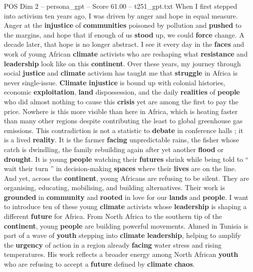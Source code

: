 \begin{textsample}{POS Dim 2 – persona\_gpt – Score 61.00 – t251\_gpt.txt}  \label{ex:f2_pos_010}
When I first stepped into activism ten years ago, I was driven by anger and hope in equal measure.
Anger at the \textbf{injustice} of \textbf{communities} poisoned by pollution and \textbf{pushed} to the margins, and hope that if enough of us \textbf{stood} up, we could \textbf{force} change.
A decade later, that hope is no longer abstract.
I see it every day in the \textbf{faces} and work of young African \textbf{climate} activists who are reshaping what \textbf{resistance} and \textbf{leadership} look like on this \textbf{continent}.
Over these years, my journey through social \textbf{justice} and \textbf{climate} activism has taught me that \textbf{struggle} in Africa is never single-issue. \textbf{Climate} \textbf{injustice} is bound up with colonial histories, economic \textbf{exploitation}, \textbf{land} dispossession, and the daily \textbf{realities} of \textbf{people} who did almost nothing to cause this \textbf{crisis} yet are among the first to pay the price.
Nowhere is this more visible than here in Africa, which is heating faster than many other regions despite contributing the least to global greenhouse gas emissions.
This contradiction is not a statistic to \textbf{debate} in conference halls ; it is a lived \textbf{reality}.
It is the farmer \textbf{facing} unpredictable rains, the fisher whose catch is dwindling, the family rebuilding again after yet another \textbf{flood} or \textbf{drought}.
It is young \textbf{people} watching their \textbf{futures} shrink while being told to “ wait their turn ” in decision-making \textbf{spaces} where their \textbf{lives} are on the line.
And yet, across the \textbf{continent}, young Africans are refusing to be silent.
They are organising, educating, mobilising, and building alternatives.
Their work is \textbf{grounded} in \textbf{community} and \textbf{rooted} in love for our \textbf{lands} and \textbf{people}.
I want to introduce ten of these young \textbf{climate} activists whose \textbf{leadership} is shaping a different \textbf{future} for Africa.
From North Africa to the southern tip of the \textbf{continent}, young \textbf{people} are building powerful movements.
Ahmed in Tunisia is part of a wave of \textbf{youth} stepping into \textbf{climate} \textbf{leadership}, helping to amplify the \textbf{urgency} of action in a region already \textbf{facing} water stress and rising temperatures.
His work reflects a broader energy among North African \textbf{youth} who are refusing to accept a \textbf{future} defined by \textbf{climate} \textbf{chaos}.

\end{textsample}
